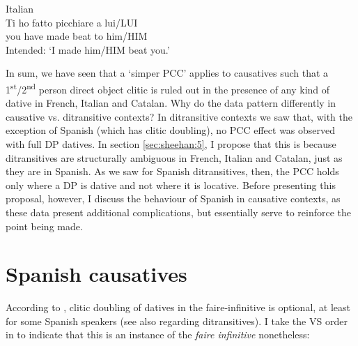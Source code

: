 \documentclass[output=paper,colorlinks,citecolor=brown,nonflat]{./langscibook}
\begin{document}
\ea%
    \label{ex:sheehan:28}
    Italian\footnotemark{}\\
    \gll    *Ti ho        fatto   picchiare   a    lui/LUI\\
            you have   made   beat     to him/HIM\\
    \glt    Intended: ‘I made him/HIM beat you.’
\z
{}

In sum, we have seen that a ‘simper PCC’ applies to causatives such that a 1\textsuperscript{st}/2\textsuperscript{nd} person direct object clitic is ruled out in the presence of any kind of dative in French, Italian and Catalan. Why do the data pattern differently in causative vs. ditransitive contexts? In ditransitive contexts we saw that, with the exception of Spanish (which has clitic doubling), no PCC effect was observed with full DP datives. In section \ref{sec:sheehan:5}, I propose that this is because ditransitives are structurally ambiguous in French, Italian and Catalan, just as they are in Spanish. As we saw for Spanish ditransitives, then, the PCC holds only where a DP is dative and not where it is locative. Before presenting this proposal, however, I discuss the behaviour of Spanish in causative contexts, as these data present additional complications, but essentially serve to reinforce the point being made. 

\section{Spanish causatives}\label{sec:sheehan:4}

According to \citet{Torrego2010}, clitic doubling of datives in the faire-infinitive is optional, at least for some Spanish speakers (see also \citealt{Pineda2013} regarding ditransitives). I take the VS order in  to indicate that this is an instance of the \textit{faire infinitive} nonetheless:
\end{document}
